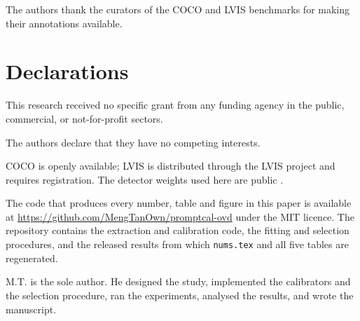 \documentclass[pdflatex,sn-basic]{sn-jnl}
\theoremstyle{plain}
\theoremstyle{definition}
\begin{document}
\backmatter

The authors thank the curators of the COCO and LVIS benchmarks for making their
annotations available.

\section*{Declarations}

This research received no specific grant from any funding agency in the public,
commercial, or not-for-profit sectors.

The authors declare that they have no competing interests.

COCO \citep{lin2014microsoft} is openly available; LVIS \citep{gupta2019lvis} is
distributed through the LVIS project and requires registration. The detector weights
used here are public \citep{liu2024grounding}.

The code that produces every number, table and figure in this paper is available at
\url{https://github.com/MengTanOwn/promptcal-ovd} under the MIT licence. The repository
contains the extraction and calibration code, the fitting and selection procedures, and
the released results from which \texttt{nums.tex} and all five tables are regenerated.

M.T. is the sole author. He designed the study, implemented the calibrators and the
selection procedure, ran the experiments, analysed the results, and wrote the manuscript.

\renewcommand{\bibfont}{\footnotesize}
\setlength{\bibsep}{0.5em}

\end{document}
